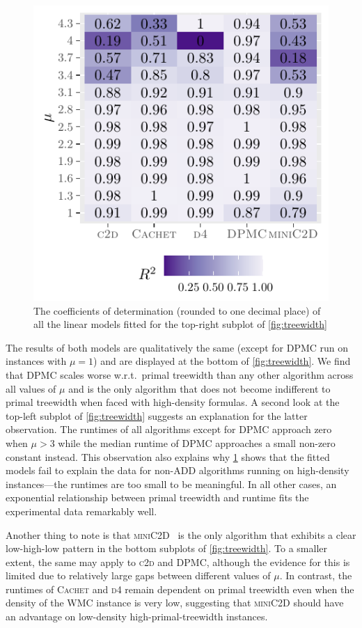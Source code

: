 \documentclass[runningheads]{llncs}
\begin{document}
\begin{figure}[t]
  \centering
  \includegraphics{r2}
  \caption{The coefficients of determination (rounded to one decimal place) of
    all the linear models fitted for the top-right subplot of
    \cref{fig:treewidth}}\label{fig:r2}
\end{figure}

The results of both models are qualitatively the same (except for \textsc{DPMC}
run on instances with $\mu = 1$) and are displayed at the bottom of
\cref{fig:treewidth}. We find that \textsc{DPMC} scales worse w.r.t.\ primal
treewidth than any other algorithm across all values of $\mu$ and is the only
algorithm that does not become indifferent to primal treewidth when faced with
high-density formulas. A second look at the top-left subplot of
\cref{fig:treewidth} suggests an explanation for the latter observation. The
runtimes of all algorithms except for \textsc{DPMC} approach zero when $\mu > 3$
while the median runtime of \textsc{DPMC} approaches a small non-zero constant
instead. This observation also explains why \cref{fig:r2} shows that the fitted
models fail to explain the data for non-ADD algorithms running on high-density
instances---the runtimes are too small to be meaningful. In all other cases, an
exponential relationship between primal treewidth and runtime fits the
experimental data remarkably well.

Another thing to note is that \textsc{miniC2D}~\cite{DBLP:conf/ijcai/OztokD15}
is the only algorithm that exhibits a clear low-high-low pattern in the bottom
subplots of \cref{fig:treewidth}. To a smaller extent, the same may apply to
\textsc{c2d} and \textsc{DPMC}, although the evidence for this is limited due to
relatively large gaps between different values of $\mu$. In contrast, the
runtimes of \textsc{Cachet} and \textsc{d4} remain dependent on primal treewidth
even when the density of the \textsf{WMC} instance is very low, suggesting that
\textsc{miniC2D} should have an advantage on low-density high-primal-treewidth
instances.
\end{document}

